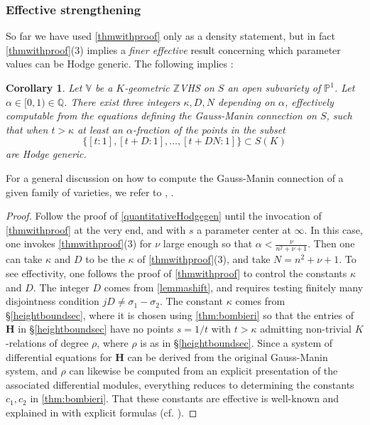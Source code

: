 \documentclass[10pt]{article}
\numberwithin{equation}{section}
\theoremstyle{plain}
\newtheorem{cor}[thm]{Corollary}
\theoremstyle{definition}
\theoremstyle{remark}
\newcommand{\greg}[1]{{\color{blue} \sf   Greg: [#1]}}
\newcommand{\Z}{\mathbb{Z}}
\newcommand{\V}{\mathbb{V}}
\newcommand{\PP}{\mathbb{P}}
\begin{document}


\subsubsection{Effective strengthening}
\label{effectsec}
So far we have used \autoref{thmwithproof} only as a density statement, but in fact \autoref{thmwithproof}(3) implies a \emph{finer effective} result concerning which parameter values can be Hodge generic. The following implies :
\begin{cor}
\label{effcor}
Let $\V$ be a $K$-geometric $\Z$VHS on $S$ an open subvariety of $\PP^1$. Let $\alpha \in [0,1) \in \mathbb{Q}$. There exist three integers $\kappa, D, N$ depending on $\alpha$, effectively computable from the equations defining the Gauss-Manin connection on $S$, such that when $t > \kappa$ at least an $\alpha$-fraction of the points in the subset
\[ \{ [t : 1], [t + D : 1], \hdots, [t + DN : 1] \} \subset S(K)\]
are Hodge generic.
\end{cor}
For a general discussion on how to compute the Gauss-Manin connection of a given family of varieties, we refer to \cite[\S2]{urbanik2021sets}, \cite[Prop. 9.4]{2024arXiv240616628B}.
\begin{proof}
Follow the proof of \autoref{quantitativeHodgegen} until the invocation of \autoref{thmwithproof} at the very end, and with $s$ a parameter center at $\infty$. In this case, one invokes \autoref{thmwithproof}(3) for $\nu$ large enough so that $\alpha < \frac{\nu}{n^2 + \nu + 1}$. Then one can take $\kappa$ and $D$ to be the $\kappa$ of \autoref{thmwithproof}(3), and take $N = n^2 + \nu + 1$. To see effectivity, one follows the proof of \autoref{thmwithproof} to control the constants $\kappa$ and $D$. The integer $D$ comes from \autoref{lemmashift}, and requires testing finitely many disjointness condition $jD \neq \sigma_1 - \sigma_2$. The constant $\kappa$ comes from \S\ref{heightboundsec}, where it is chosen using \autoref{thm:bombieri} so that the entries of $\mathbf{H}$ in \S\ref{heightboundsec} have no points $s = 1/t$ with $t > \kappa$ admitting non-trivial $K$-relations of degree $\rho$, where $\rho$ is as in \S\ref{heightboundsec}. Since a system of differential equations for $\mathbf{H}$ can be derived from the original Gauss-Manin system, and $\rho$ can likewise be computed from an explicit presentation of the associated differential modules, everything reduces to determining the constants $c_{1}, c_{2}$ in \autoref{thm:bombieri}. That these constants are effective is well-known and explained in \cite[\S VII]{zbMATH00041964} with explicit formulas (cf. \cite[\S11, \S12]{zbMATH03721021}).
\end{proof}
\end{document}
